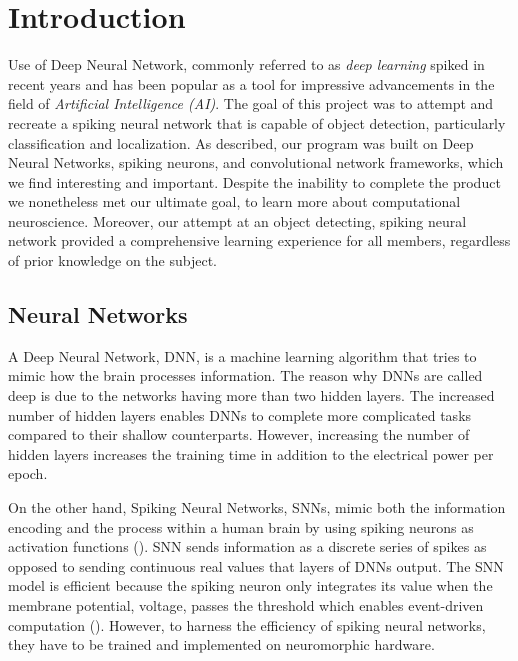\section{Introduction}

Use of Deep Neural Network, commonly referred to as
\emph{deep learning} spiked in recent years and has been popular
as a tool for impressive advancements in the field of 
\emph{Artificial Intelligence (AI)}.
The goal of this project was to attempt and recreate a spiking neural network that is capable of object detection, particularly classification and localization. As described, our program was built on Deep Neural Networks, spiking neurons, and convolutional network frameworks, which we find interesting and important. Despite the inability to complete the product we nonetheless met our ultimate goal, to learn more about computational neuroscience. Moreover, our attempt at an object detecting, spiking neural network provided a comprehensive learning experience for all members, regardless of prior knowledge on the subject. 

\subsection{Neural Networks}


A Deep Neural Network, DNN, is a machine learning algorithm that tries to mimic how the brain processes information. The reason why DNNs are called deep is due to the networks having more than two hidden layers. The increased number of hidden layers enables DNNs to complete more complicated tasks compared to their shallow counterparts. However, increasing the number of hidden layers increases the training time in addition to the electrical power per epoch. 


On the other hand, Spiking Neural Networks, SNNs, mimic both the information encoding and the process within a human brain by using spiking neurons as activation functions (). SNN sends information as a discrete series of spikes as opposed to sending continuous real values that layers of DNNs output. The SNN model is efficient because the spiking neuron only integrates its value when the membrane potential, voltage, passes the threshold which enables event-driven computation (). However, to harness the efficiency of spiking neural networks, they have to be trained and implemented on neuromorphic hardware.

